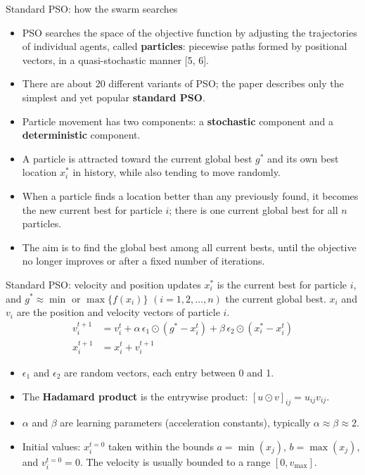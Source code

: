 \documentclass[aspectratio=169,11pt]{beamer}
\newcommand{\hdr}[1]{\gdef\curhdr{#1}}
\gdef\curhdr{}
\begin{document}
\hdr{2 Particle Swarm Optimization \textperiodcentered{} 2.1 Standard PSO}
\begin{frame}[t]{Standard PSO: how the swarm searches}
\small
\begin{itemize}\itemsep0.45em
  \item PSO searches the space of the objective function by adjusting the trajectories of individual agents, called \textbf{particles}: piecewise paths formed by positional vectors, in a quasi-stochastic manner [5, 6].
  \item There are about 20 different variants of PSO; the paper describes only the simplest and yet popular \textbf{standard PSO}.
  \item Particle movement has two components: a \textbf{stochastic} component and a \textbf{deterministic} component.
  \item A particle is attracted toward the current global best $g^*$ and its own best location $x_i^*$ in history, while also tending to move randomly.
  \item When a particle finds a location better than any previously found, it becomes the new current best for particle $i$; there is one current global best for all $n$ particles.
  \item The aim is to find the global best among all current bests, until the objective no longer improves or after a fixed number of iterations.
\end{itemize}
\end{frame}

\begin{frame}[t]{Standard PSO: velocity and position updates}
\small
$x_i^*$ is the current best for particle $i$, and $g^*\approx\min\text{ or }\max\{f(x_i)\}$ $(i=1,2,\dots,n)$ the current global best. $x_i$ and $v_i$ are the position and velocity vectors of particle $i$.
\begin{align*}
v_i^{t+1}&=v_i^{t}+\alpha\,\epsilon_1\odot(g^*-x_i^t)+\beta\,\epsilon_2\odot(x_i^*-x_i^t)\tag{1}\\
x_i^{t+1}&=x_i^{t}+v_i^{t+1}\tag{2}
\end{align*}
\begin{itemize}\itemsep0.3em
  \item $\epsilon_1$ and $\epsilon_2$ are random vectors, each entry between 0 and 1.
  \item The \textbf{Hadamard product} is the entrywise product: $[u\odot v]_{ij}=u_{ij}v_{ij}$.
  \item $\alpha$ and $\beta$ are learning parameters (acceleration constants), typically $\alpha\approx\beta\approx 2$.
  \item Initial values: $x_i^{t=0}$ taken within the bounds $a=\min(x_j)$, $b=\max(x_j)$, and $v_i^{t=0}=0$. The velocity is usually bounded to a range $[0,v_{\max}]$.
\end{itemize}
\end{frame}
\end{document}
